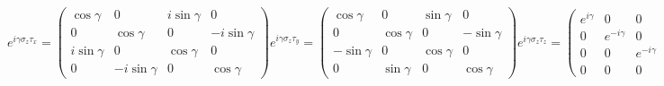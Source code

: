 \begin{equation*}
e^{i\gamma\sigma_z\tau_x}=
\begin{pmatrix}
    \cos\gamma & 0 & i\sin\gamma & 0 \\
    0 & \cos\gamma & 0 & -i\sin\gamma \\
    i\sin\gamma & 0 & \cos\gamma & 0 \\
    0 & -i\sin\gamma & 0 & \cos\gamma
\end{pmatrix}
e^{i\gamma\sigma_z\tau_y}=
\begin{pmatrix}
    \cos\gamma & 0 & \sin\gamma & 0 \\
    0 & \cos\gamma & 0 & -\sin\gamma \\
    -\sin\gamma & 0 & \cos\gamma & 0 \\
    0 & \sin\gamma & 0 & \cos\gamma
\end{pmatrix}
e^{i\gamma\sigma_z\tau_z}=
\begin{pmatrix}
    e^{i\gamma} & 0 & 0 & 0 \\
    0 & e^{-i\gamma} & 0 & 0 \\
    0 & 0 & e^{-i\gamma} & 0 \\
    0 & 0 & 0 & e^{i\gamma}
\end{pmatrix}
\end{equation*}
\normalsize

